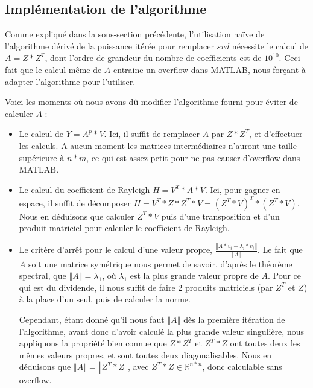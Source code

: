 \documentclass[a4paper,12pt]{article}
\newcommand{\norme}[1]{\left\Vert #1\right\Vert}
\begin{document}
    \subsection{Implémentation de l'algorithme}

        Comme expliqué dans la sous-section précédente, l'utilisation naïve de
        l'algorithme dérivé de la puissance itérée pour remplacer $svd$
        nécessite le calcul de $A = Z*Z^T$, dont l'ordre de grandeur du nombre
        de coefficients est de $10^{10}$. Ceci fait que le calcul même de $A$
        entraine un overflow dans MATLAB, nous forçant à adapter l'algorithme
        pour l'utiliser.

        Voici les moments où nous avons dû modifier l'algorithme fourni pour
        éviter de calculer $A$ :

        \begin{itemize}
        \item Le calcul de $Y = A^p*V$. Ici, il suffit de remplacer $A$ par
            $Z*Z^T$, et d'effectuer les calculs. A aucun moment les matrices
            intermédiaires n'auront une taille supérieure à $n*m$, ce qui est
            assez petit pour ne pas causer d'overflow dans MATLAB.

        \item Le calcul du coefficient de Rayleigh $H = V^T*A*V$. Ici, pour
            gagner en espace, il suffit de décomposer $H = V^T*Z*Z^T*V =
            (Z^T*V)^T*(Z^T*V)$. Nous en déduisons que calculer $Z^T*V$ puis
            d'une transposition et d'un produit matriciel pour calculer le
            coefficient de Rayleigh.

        \item Le critère d'arrêt pour le calcul d'une valeur propre,
            $\displaystyle \frac{\norme{A*v_i - \lambda_i*v_i}}{\norme{A}}$.
            Le fait que $A$ soit une matrice symétrique nous permet de savoir,
            d'après le théorème spectral, que $\norme{A} = \lambda_1$, où
            $\lambda_1$ est la plus grande valeur propre de $A$. Pour ce qui est
            du dividende, il nous suffit de faire 2 produits matriciels (par
            $Z^T$ et $Z$) à la place d'un seul, puis de calculer la norme.

            Cependant, étant donné qu'il nous faut $\norme{A}$ dès la première
            itération de l'algorithme, avant donc d'avoir calculé la plus grande
            valeur singulière, nous appliquons la propriété bien connue que
            $Z*Z^T$ et $Z^T*Z$ ont toutes deux les mêmes valeurs propres, et
            sont toutes deux diagonalisables. Nous en déduisons que $\norme{A} =
            \norme{Z^T*Z}$, avec $Z^T*Z \in \mathbb{R}^{n*n}$, donc calculable
            sans overflow.


\end{itemize}
\end{document}
